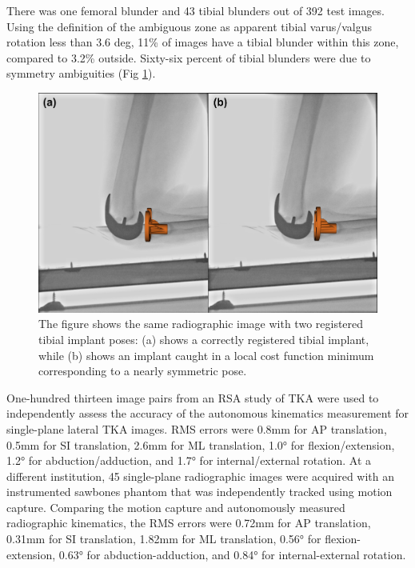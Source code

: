 {There was one femoral blunder and 43 tibial blunders out of 392 test images. Using the definition of the ambiguous zone as apparent tibial varus/valgus rotation less than 3.6 deg, 11\% of images have a tibial blunder within this zone, compared to 3.2\% outside. Sixty-six percent of tibial blunders were due to symmetry ambiguities (Fig \ref{fig:sym-trap}).


\begin{figure}[!h]
	\centering
	\includegraphics[width = \linewidth]{figs/jtml-paper/fig6-symtrap.png}
	\caption{The figure shows the same radiographic image with two registered tibial implant poses: (a) shows a correctly registered tibial implant, while (b) shows an implant caught in a local cost function minimum corresponding to a nearly symmetric pose.}
	\label{fig:sym-trap}
\end{figure}

One-hundred thirteen image pairs from an RSA study of TKA were used to independently assess the accuracy of the autonomous kinematics measurement for single-plane lateral TKA images.
RMS errors were 0.8mm for AP translation, 0.5mm for SI translation, 2.6mm for ML translation, 1.0° for flexion/extension, 1.2° for abduction/adduction, and 1.7° for internal/external rotation.
At a different institution, 45 single-plane radiographic images were acquired with an instrumented sawbones phantom that was independently tracked using motion capture.
Comparing the motion capture and autonomously measured radiographic kinematics, the RMS errors were 0.72mm for AP translation, 0.31mm for SI translation, 1.82mm for ML translation, 0.56° for flexion-extension, 0.63° for abduction-adduction, and 0.84° for internal-external rotation.

}
